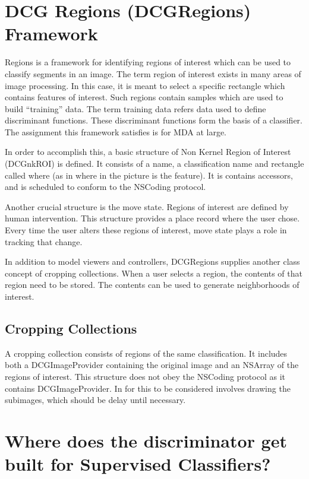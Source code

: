 \documentclass[12pt]{report}
\begin{document}
\section{DCG Regions (DCGRegions) Framework}
Regions is a framework for identifying regions of interest which can be used to classify segments in an image.  The term region of interest exists in many areas of image processing.  In this case, it is meant to select a specific rectangle which contains features of interest.   Such regions contain samples which are used to build ``training'' data.  The term training data refers data used to define discriminant functions.  These discriminant functions form the basis of a classifier.   The assignment this framework satisfies is for MDA at large.  

In order to accomplish this, a basic structure of Non Kernel Region of Interest (DCGnkROI) is defined.   It consists of a name, a classification name and rectangle called where (as in where in the picture is the feature).  It is contains accessors, and is scheduled to conform to the NSCoding protocol.  

Another crucial structure is the move state.  Regions of interest are defined by human intervention.  This structure provides a place record where the user chose.  Every time the user alters these regions of interest, move state plays a role in tracking that change.     

In addition to model viewers and controllers, DCGRegions supplies another class concept of cropping collections.  When a user selects a region, the contents of that region need to be stored.  The contents can be used to generate neighborhoods of interest.  

\subsection{Cropping Collections}

A cropping collection consists of regions of the same classification.  It includes both a DCGImageProvider containing the original image and an NSArray of the regions of interest.  This structure does not obey the NSCoding protocol as it contains DCGImageProvider.   In for this to be considered involves drawing the subimages, which should be delay until necessary.   



\section{Where does the discriminator get built for Supervised Classifiers?}
\end{document}
